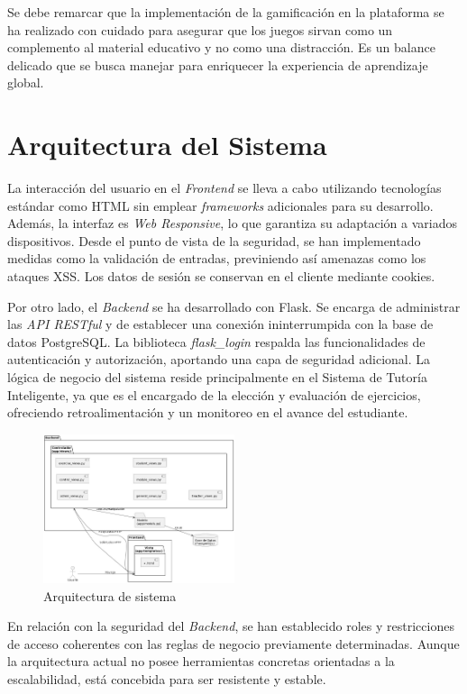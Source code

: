 Se debe remarcar que la implementación de la gamificación en la plataforma se ha realizado con cuidado para asegurar que los juegos sirvan como un complemento al material educativo y no como una distracción. Es un balance delicado que se busca manejar para enriquecer la experiencia de aprendizaje global.

\section{Arquitectura del Sistema}

La interacción del usuario en el \textit{Frontend} se lleva a cabo utilizando tecnologías estándar como HTML sin emplear \textit{frameworks} adicionales para su desarrollo. Además, la interfaz es \textit{Web Responsive}, lo que garantiza su adaptación a variados dispositivos. Desde el punto de vista de la seguridad, se han implementado medidas como la validación de entradas, previniendo así amenazas como los ataques XSS. Los datos de sesión se conservan en el cliente mediante cookies.

Por otro lado, el \textit{Backend} se ha desarrollado con Flask. Se encarga de administrar las \textit{API RESTful} y de establecer una conexión ininterrumpida con la base de datos PostgreSQL. La biblioteca \textit{flask\_login} respalda las funcionalidades de autenticación y autorización, aportando una capa de seguridad adicional. La lógica de negocio del sistema reside principalmente en el Sistema de Tutoría Inteligente, ya que es el encargado de la elección y evaluación de ejercicios, ofreciendo retroalimentación y un monitoreo en el avance del estudiante.

\begin{figure}[H]
    \centering
    \includegraphics[width=0.5\textwidth]{imagenes/ArquitecturaDeSistema.jpeg}
    \caption{Arquitectura de sistema}
    \label{fig:arqsistema}
\end{figure}

En relación con la seguridad del \textit{Backend}, se han establecido roles y restricciones de acceso coherentes con las reglas de negocio previamente determinadas. Aunque la arquitectura actual no posee herramientas concretas orientadas a la escalabilidad, está concebida para ser resistente y estable.

